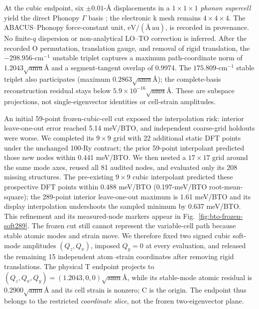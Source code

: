 \documentclass[final,5p,times,twocolumn]{elsarticle}
\begin{document}
At the cubic endpoint, six $\pm0.01$-\AA{} displacements in a
$1\times1\times1$ \emph{phonon supercell} yield the direct Phonopy $\Gamma$
basis \cite{Togo2015}; the electronic k mesh remains $4\times4\times4$.
The ABACUS--Phonopy force-constant unit, $\mathrm{eV}/(\text{\AA}\,\mathrm{au})$,
is recorded in provenance. No finite-$q$ dispersion or non-analytical LO--TO
correction is inferred. After the recorded O permutation, translation gauge,
and removal of rigid translation, the $-298.956$-cm$^{-1}$ unstable triplet
captures a maximum path-coordinate norm of $1.2043\sqrt{\mathrm{amu}}$\AA{}
and a segment-tangent overlap of 0.9974. The $175.809$-cm$^{-1}$ stable
triplet also participates (maximum $0.2863\sqrt{\mathrm{amu}}$\AA{}); the
complete-basis reconstruction residual stays below
$5.9\times10^{-16}\sqrt{\mathrm{amu}}$\AA{}. These are subspace projections,
not single-eigenvector identities or cell-strain amplitudes.

An initial 59-point frozen-cubic-cell cut exposed the interpolation risk:
interior leave-one-out error reached 5.14 meV/BTO, and independent coarse-grid
holdouts were worse. We completed its $9\times9$ grid with 22 additional
static DFT points under the unchanged 100-Ry contract; the prior 59-point
interpolant predicted those new nodes within 0.441 meV/BTO. We then nested a
$17\times17$ grid around the same mode axes, reused all 81 audited nodes,
and evaluated only its 208 missing structures. The pre-existing $9\times9$
cubic interpolant predicted these prospective DFT points within
0.488 meV/BTO (0.197-meV/BTO root-mean-square); the 289-point interior
leave-one-out maximum is 1.61 meV/BTO and its display interpolation
undershoots the sampled minimum by 0.637 meV/BTO. This refinement and its
measured-node markers appear in Fig.~\ref{fig:bto-frozen-soft289}. The frozen cut still cannot represent the
variable-cell path because stable atomic modes and strain move. We therefore
fixed two signed cubic soft-mode
amplitudes $(Q_z,Q_x)$, imposed $Q_y=0$ at every evaluation, and released the
remaining 15 independent atom--strain coordinates after removing rigid
translations. The physical T endpoint projects to
$(Q_z,Q_x,Q_y)=(1.2043,0,0)\sqrt{\mathrm{amu}}$\AA{}, while its stable-mode
atomic residual is $0.2900\sqrt{\mathrm{amu}}$\AA{} and its cell strain is
nonzero; C is the origin. The endpoint thus belongs to the restricted
\emph{coordinate slice}, not the frozen two-eigenvector plane.
\end{document}
